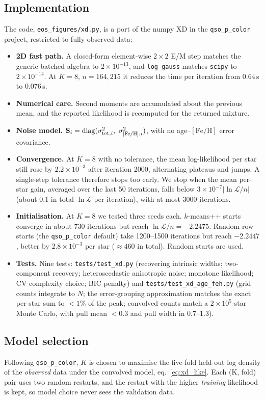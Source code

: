 \documentclass[11pt,a4paper]{article}
\newcommand{\feh}{\ensuremath{[\mathrm{Fe/H}]}}
\begin{document}
\subsection{Implementation}
The code, \texttt{eos\_figures/xd.py}, is a port of the numpy XD in the \texttt{qso\_p\_color} project, restricted to fully observed data:
\begin{itemize}
  \item \textbf{2D fast path.} A closed-form element-wise $2\times2$ E/M step matches the generic batched algebra to $2\times10^{-13}$, and \texttt{log\_gauss} matches \texttt{scipy} to $2\times10^{-14}$. At $K=8$, $n=164{,}215$ it reduces the time per iteration from $0.64$\,s to $0.076$\,s.
  \item \textbf{Numerical care.} Second moments are accumulated about the previous mean, and the reported likelihood is recomputed for the returned mixture.
  \item \textbf{Noise model.} $\mathbf S_i=\mathrm{diag}(\sigma_{{\rm tot},i}^2,\ \sigma_{\feh,i}^2)$, with no age--\feh{} error covariance.
  \item \textbf{Convergence.} At $K=8$ with no tolerance, the mean log-likelihood per star still rose by $2.2\times10^{-3}$ after iteration 2000, alternating plateaus and jumps. A single-step tolerance therefore stops too early. We stop when the mean per-star gain, averaged over the last 50 iterations, falls below $3\times10^{-7}|\ln\mathcal L/n|$ (about 0.1 in total $\ln\mathcal L$ per iteration), with at most 3000 iterations.
  \item \textbf{Initialisation.} At $K=8$ we tested three seeds each. $k$-means++ starts converge in about 730 iterations but reach $\ln\mathcal L/n=-2.2475$. Random-row starts (the \texttt{qso\_p\_color} default) take 1200--1500 iterations but reach $-2.2447$, better by $2.8\times10^{-3}$ per star ($\approx460$ in total). Random starts are used.
  \item \textbf{Tests.} Nine tests: \texttt{tests/test\_xd.py} (recovering intrinsic widths; two-component recovery; heteroscedastic anisotropic noise; monotone likelihood; CV complexity choice; BIC penalty) and \texttt{tests/test\_xd\_age\_feh.py} (grid counts integrate to $N$; the error-grouping approximation matches the exact per-star sum to $<1\%$ of the peak; convolved counts match a $2\times10^5$-star Monte Carlo, with pull mean $<0.3$ and pull width in 0.7--1.3).
\end{itemize}

\subsection{Model selection}
Following \texttt{qso\_p\_color}, $K$ is chosen to maximise the five-fold held-out log density of the \emph{observed} data under the convolved model, eq.~\eqref{eq:xd_like}. Each (K, fold) pair uses two random restarts, and the restart with the higher \emph{training} likelihood is kept, so model choice never sees the validation data.
\end{document}
